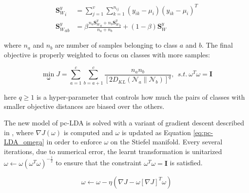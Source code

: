         \begin{align}
            {\boldsymbol{S}_W^y}_i &= \sum_{j=1}^{v}\sum_{k=1}^{n_{ij}}{\left(y_{ik}-\mu_i\right)\left(y_{ik}-\mu_i\right)^T} \label{eq:pc-LDA_Sw_i}\\
            {\boldsymbol{S}_W^y}_{ab} &= \beta\frac{n_a{\boldsymbol{S}_W^y}_a+n_b{\boldsymbol{S}_W^y}_b}{n_a+n_b}+\left(1-\beta\right){\boldsymbol{S}_W^y}
            \label{eq:pc-LDA_Sw_ab}
        \end{align}

        where $n_a$ and $n_b$ are number of samples belonging to class $a$ and $b$. The final objective is properly weighted to focus on classes with more samples:

        \begin{equation}
            \operatorname*{min}_{\boldsymbol{\omega}}{J}=\sum_{a=1}^{c}\sum_{b=a+1}^{c}{\frac{n_an_b}{{[2D_{KL}\left(\mathcal{N}_a\parallel\mathcal{N}_b\right)]}^q}},\ \ s.t.\ \omega^T\omega=\boldsymbol{I}
            \label{eq:pc-LDA}
        \end{equation}

        here $q\ge1$ is a hyper-parameter that controls how much the pairs of classes with smaller objective distances are biased over the others.

        The new model of pc-LDA is solved with a variant of gradient descent described in \cite{kong2014pairwise}, where $\nabla J\left(\omega\right)$ is computed and $\omega$ is updated as Equation \eqref{eq:pc-LDA_omega} in order to enforce $\omega$ on the Stiefel manifold. Every several iterations, due to numerical error, the learnt transformation is unitarized $\omega \leftarrow \omega{\left(\omega^T\omega\right)}^{-\frac{1}{2}}$ to ensure that the constraint $\omega^T\omega = \boldsymbol{I}$ is satisfied.

        \begin{equation}
            \omega \leftarrow \omega - \eta\left(\nabla J - \omega{[\nabla J]}^T\omega\right)
            \label{eq:pc-LDA_omega}
        \end{equation}
